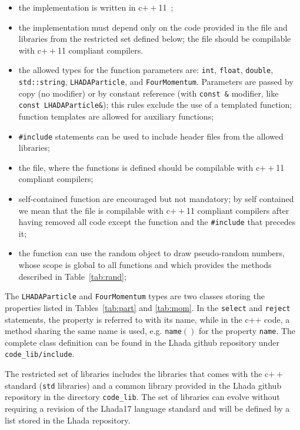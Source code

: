 \documentclass[11pt]{cernrep}
\begin{document}
\begin{itemize}
\item the implementation is written in c$++$11~\cite{bib:c++11};
\item the implementation must depend only on the code provided in the file and libraries from the restricted set defined below; the file should be compilable with c$++$11 compliant compilers.
\item the allowed types for the function parameters are: {\tt int}, {\tt float}, {\tt double}, {\tt std::string}, {\tt LHADAParticle}, and {\tt FourMomentum}. Parameters are passed by copy (no modifier) or by constant reference (with {\tt const \&} modifier, like {\tt const LHADAParticle\&}); this rules exclude the use of a templated function; function templates are allowed for auxiliary functions; 
\item {\tt \#include} statements can be used to include header files from the allowed libraries;
\item the file, where the functions is defined should be compilable with c$++$11 compliant compilers;
\item self-contained function are encouraged but not mandatory; by self contained we mean that the file is compilable with c$++$11 compliant compilers after having removed all code except the function and the {\tt \#include} that precedes it;
\item the function can use the random object to draw pseudo-random numbers, whose scope is global to all functions and which provides the methods described in Table~\ref{tab:rand}; 
\end{itemize}

The {\tt LHADAParticle} and {\tt FourMomentum} types are two classes storing the properties listed in Tables~\ref{tab:part} and \ref{tab:mom}. In the {\tt select} and {\tt reject} statements, the property is referred to with its name, while in the c++ code, a method sharing the same name is used, e.g. {\tt name$()$} for the property {\tt name}. The complete class definition can be found in the {\sc Lhada} github repository under {\tt code\_lib/include}.

The restricted set of libraries includes the libraries that comes with the c$++$ standard ({\tt std} libraries) and a common library provided in the {\sc Lhada} github repository in the directory {\tt code\_lib}.  The set of libraries can evolve without requiring a revision of the {\sc Lhada17} language standard and will be defined by a list stored in the {\sc Lhada} repository.
\end{document}
